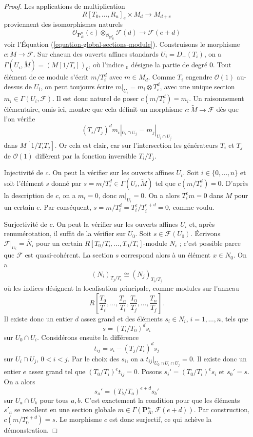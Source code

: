 \begin{proof}
Les applications de multiplication
$$
R[T_0, \ldots, R_n]_e \times M_d \longrightarrow M_{d + e}
$$
proviennent des isomorphismes naturels
$$
\mathcal{O}_{\mathbf{P}^n_R}(e)
\otimes_{\mathcal{O}_{\mathbf{P}^n_R}}
\mathcal{F}(d)
\longrightarrow
\mathcal{F}(e + d)
$$
voir l'Équation (\ref{equation-global-sections-module}). Construisons le
morphisme $c : \widetilde{M} \to \mathcal{F}$. Sur chacun des ouverts affines
standards $U_i = D_{+}(T_i)$, on a
$\Gamma(U_i, \widetilde{M}) = (M[1/T_i])_0$, où l'indice ${}_0$ désigne la
partie de degré $0$. Tout élément de ce module s'écrit $m/T_i^d$ avec
$m \in M_d$. Comme $T_i$ engendre $\mathcal{O}(1)$ au-dessus de $U_i$, on
peut toujours écrire $m|_{U_i} = m_i \otimes T_i^d$, avec une unique section
$m_i \in \Gamma(U_i, \mathcal{F})$. Il est donc naturel de poser
$c(m/T_i^d) = m_i$. Un raisonnement élémentaire, omis ici, montre que cela
définit un morphisme $c : \widetilde{M} \to \mathcal{F}$ dès que l'on vérifie
$$
(T_i/T_j)^d m_i|_{U_i \cap U_j} = m_j|_{U_i \cap U_j}
$$
dans $M[1/T_iT_j]$. Or cela est clair,
car sur l'intersection les générateurs
$T_i$ et $T_j$ de $\mathcal{O}(1)$ diffèrent par la fonction inversible
$T_i/T_j$.

\medskip\noindent
Injectivité de $c$. On peut la vérifier sur les ouverts affines $U_i$.
Soit $i \in \{0, \ldots, n\}$ et soit l'élément $s$ donné par
$s = m/T_i^d \in \Gamma(U_i, \widetilde{M})$ tel que
$c(m/T_i^d) = 0$. D'après la description de $c$, on a $m_i = 0$, donc
$m|_{U_i} = 0$. On a alors $T_i^em = 0$ dans $M$ pour un certain $e$.
Par conséquent, $s = m/T_i^d = T_i^e/T_i^{e + d} = 0$, comme voulu.

\medskip\noindent
Surjectivité de $c$. On peut la vérifier sur les ouverts affines $U_i$ et,
après renumérotation, il suffit de la vérifier sur $U_0$.
Soit $s \in \mathcal{F}(U_0)$. Écrivons
$\mathcal{F}|_{U_i} = \widetilde{N_i}$ pour un certain
$R[T_0/T_i, \ldots, T_0/T_i]$-module $N_i$ ; c'est possible parce que
$\mathcal{F}$ est quasi-cohérent. La section $s$ correspond alors à un élément
$x \in N_0$. On a
$$
(N_i)_{T_j/T_i} \cong (N_j)_{T_i/T_j}
$$
où les indices désignent la localisation principale, comme modules sur
l'anneau
$$
R\left[
\frac{T_0}{T_i}, \ldots, \frac{T_n}{T_i},
\frac{T_0}{T_j}, \ldots, \frac{T_n}{T_j}
\right].
$$
Il existe donc un entier $d$ assez grand et des éléments
$s_i \in N_i$, $i = 1, \ldots, n$, tels que
$$
s = (T_i/T_0)^d s_i
$$
sur $U_0 \cap U_i$. Considérons ensuite la différence
$$
t_{ij} = s_i - (T_j/T_i)^d s_j
$$
sur $U_i \cap U_j$, $0 < i < j$. Par le choix des $s_i$, on a
$t_{ij}|_{U_0 \cap U_i \cap U_j} = 0$. Il existe donc un entier $e$ assez
grand tel que $(T_0/T_i)^et_{ij} = 0$. Posons
$s_i' = (T_0/T_i)^es_i$ et $s_0' = s$. On a alors
$$
s_a' = (T_b/T_a)^{e + d} s_b'
$$
sur $U_a \cap U_b$ pour tous $a, b$. C'est exactement la condition pour que
les éléments $s'_a$ se recollent en une section globale
$m \in \Gamma(\mathbf{P}^n_R, \mathcal{F}(e + d))$.
Par construction, $c(m/T_0^{e + d}) = s$. Le morphisme $c$ est donc surjectif,
ce qui achève la démonstration.
\end{proof}

